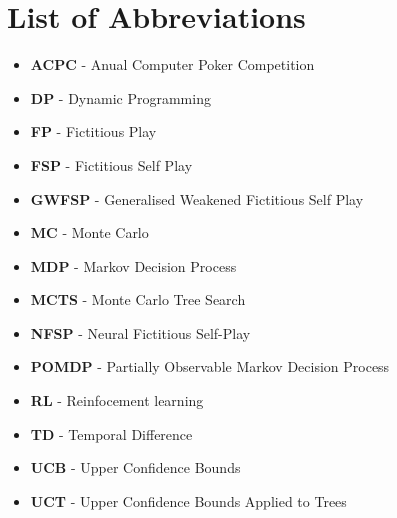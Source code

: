 \pagebreak

\section*{List of Abbreviations}\label{sec:listOfAbbreviations}

\begin{itemize}
    \item \textbf{ACPC} - Anual Computer Poker Competition
    \item \textbf{DP} - Dynamic Programming
    \item \textbf{FP} - Fictitious Play
    \item \textbf{FSP} - Fictitious Self Play
    \item \textbf{GWFSP} - Generalised Weakened Fictitious Self Play
    \item \textbf{MC} - Monte Carlo
    \item \textbf{MDP} - Markov Decision Process
    \item \textbf{MCTS} - Monte Carlo Tree Search
    \item \textbf{NFSP} - Neural Fictitious Self-Play
    \item \textbf{POMDP} - Partially Observable Markov Decision Process
    \item \textbf{RL} - Reinfocement learning
    \item \textbf{TD} - Temporal Difference
    \item \textbf{UCB} - Upper Confidence Bounds
    \item \textbf{UCT} - Upper Confidence Bounds Applied to Trees
\end{itemize}